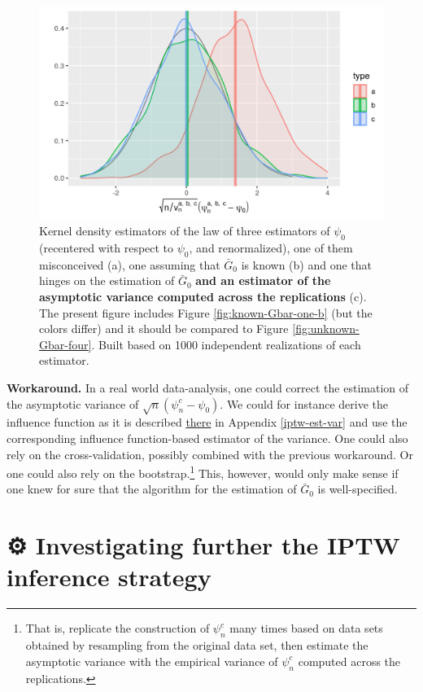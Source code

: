 \documentclass[
  11pt,
  openright,twoside]{book}
\newcommand{\gear}{\usebox{\gearbox}\;}
\newcommand{\Gbar}{\bar{G}}
\theoremstyle{definition}
\theoremstyle{definition}
\theoremstyle{definition}
\theoremstyle{definition}
\theoremstyle{remark}
\begin{document}
\begin{figure}

{\centering \includegraphics[width=0.7\linewidth]{img/unknown-Gbar-seven-1} 

}

\caption{Kernel density estimators of the law of three estimators of \(\psi_{0}\) (recentered with respect to \(\psi_{0}\), and renormalized), one of them misconceived (a), one assuming that \(\Gbar_{0}\) is known (b) and one that hinges on the estimation of \(\Gbar_{0}\) \textbf{and an estimator of the asymptotic variance computed across the replications} (c). The present figure includes Figure \ref{fig:known-Gbar-one-b} (but the colors differ) and it should be compared to Figure \ref{fig:unknown-Gbar-four}. Built based on 1000 independent realizations of each estimator.}\label{fig:unknown-Gbar-seven}
\end{figure}

\textbf{Workaround.} In a real world data-analysis, one could correct the
estimation of the asymptotic variance of \(\sqrt{n} (\psi_{n}^{c} - \psi_{0})\).
We could for instance derive the influence function as it is
described \protect\hyperlink{iptw-est-var}{there} in Appendix \ref{iptw-est-var} and use the
corresponding influence function-based estimator of the variance. One could
also rely on the cross-validation, possibly combined with the previous
workaround. Or one could also rely on the bootstrap.\footnote{That is, replicate the
  construction of \(\psi_{n}^{c}\) many times based on data sets obtained by
  resampling from the original data set, then estimate the asymptotic variance
  with the empirical variance of \(\psi_{n}^{c}\) computed across the
  replications.} This, however, would only make sense if one knew for sure that
the algorithm for the estimation of \(\Gbar_{0}\) is well-specified.

\hypertarget{exo-a-nice-title}{%
\section{\texorpdfstring{⚙ \gear Investigating further the IPTW inference strategy}{⚙ Investigating further the IPTW inference strategy}}\label{exo-a-nice-title}}
\end{document}
